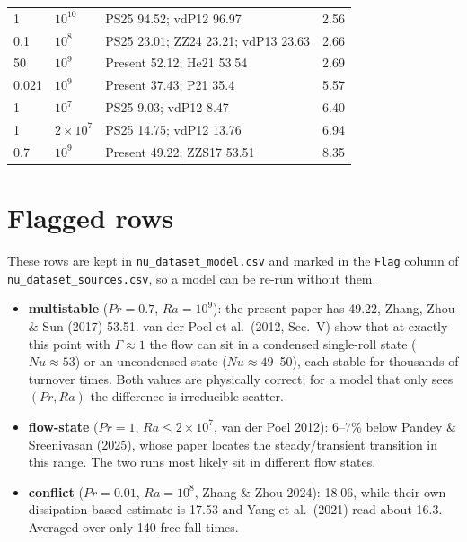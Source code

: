 \documentclass[11pt]{article}
\begin{document}
\begin{longtable}{l l p{9.5cm} r}
\rowcolor{included} 1 & $10^{10}$ & PS25 94.52; vdP12 96.97 & 2.56 \\
\rowcolor{included} 0.1 & $10^{8}$ & PS25 23.01; ZZ24 23.21; vdP13 23.63 & 2.66 \\
\rowcolor{included} 50 & $10^{9}$ & Present 52.12; He21 53.54 & 2.69 \\
\rowcolor{excluded} 0.021 & $10^{9}$ & Present 37.43; P21 35.4 & 5.57 \\
\rowcolor{excluded} 1 & $10^{7}$ & PS25 9.03; vdP12 8.47 & 6.40 \\
\rowcolor{excluded} 1 & $2\times10^{7}$ & PS25 14.75; vdP12 13.76 & 6.94 \\
\rowcolor{excluded} 0.7 & $10^{9}$ & Present 49.22; ZZS17 53.51 & 8.35 \\
\end{longtable}

\section{Flagged rows}\label{sec:flags}
These rows are kept in \texttt{nu\_dataset\_model.csv} and marked in the
\texttt{Flag} column of \texttt{nu\_dataset\_sources.csv}, so a model can be
re-run without them.

\begin{itemize}[leftmargin=1.4em, itemsep=0.3em]
\item \textbf{multistable} ($Pr=0.7$, $Ra=10^9$): the present paper has
49.22, Zhang, Zhou \& Sun (2017) 53.51. van der Poel et al.\ (2012, Sec.~V)
show that at exactly this point with $\Gamma\approx1$ the flow can sit in a
condensed single-roll state ($Nu\approx53$) or an uncondensed state
($Nu\approx49$--50), each stable for thousands of turnover times. Both
values are physically correct; for a model that only sees $(Pr, Ra)$ the
difference is irreducible scatter.
\item \textbf{flow-state} ($Pr=1$, $Ra\le2\times10^7$, van der Poel 2012):
6--7\% below Pandey \& Sreenivasan (2025), whose paper locates the
steady/transient transition in this range. The two runs most likely sit in
different flow states.
\item \textbf{conflict} ($Pr=0.01$, $Ra=10^8$, Zhang \& Zhou 2024): 18.06,
while their own dissipation-based estimate is 17.53 and Yang et al.\
(2021) read about 16.3. Averaged over only 140 free-fall times.
\end{itemize}
\end{document}
